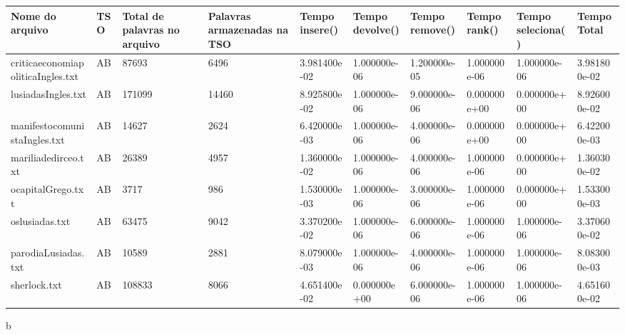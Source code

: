 \begin{tabular}{|l|l|l|l|l|l|l|l|l|l|}
\hline
Nome do arquivo&TSO&Total de palavras no arquivo&Palavras armazenadas na TSO&Tempo insere()&Tempo devolve()&Tempo remove()&Tempo rank()&Tempo seleciona()&Tempo Total\\
\hline
criticaeconomiapoliticaIngles.txt&AB&87693&6496&3.981400e-02&1.000000e-06&1.200000e-05&1.000000e-06&1.000000e-06&3.981800e-02\\
\hline
lusiadasIngles.txt&AB&171099&14460&8.925800e-02&1.000000e-06&9.000000e-06&0.000000e+00&0.000000e+00&8.926000e-02\\
\hline
manifestocomunistaIngles.txt&AB&14627&2624&6.420000e-03&1.000000e-06&4.000000e-06&0.000000e+00&0.000000e+00&6.422000e-03\\
\hline
mariliadedirceo.txt&AB&26389&4957&1.360000e-02&1.000000e-06&4.000000e-06&1.000000e-06&0.000000e+00&1.360300e-02\\
\hline
ocapitalGrego.txt&AB&3717&986&1.530000e-03&1.000000e-06&3.000000e-06&1.000000e-06&0.000000e+00&1.533000e-03\\
\hline
oslusiadas.txt&AB&63475&9042&3.370200e-02&1.000000e-06&6.000000e-06&1.000000e-06&1.000000e-06&3.370600e-02\\
\hline
parodiaLusiadas.txt&AB&10589&2881&8.079000e-03&1.000000e-06&4.000000e-06&1.000000e-06&1.000000e-06&8.083000e-03\\
\hline
sherlock.txt&AB&108833&8066&4.651400e-02&0.000000e+00&6.000000e-06&1.000000e-06&1.000000e-06&4.651600e-02\\
\hline
\end{tabular}b